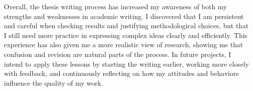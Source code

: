 \documentclass[12pt,a4paper]{article}
\begin{document}
	Overall, the thesis writing process has increased my awareness of both my strengths and weaknesses in academic writing. I discovered that I am persistent and careful when checking results and justifying methodological choices, but that I still need more practice in expressing complex ideas clearly and efficiently. This experience has also given me a more realistic view of research, showing me that confusion and revision are natural parts of the process. In future projects, I intend to apply these lessons by starting the writing earlier, working more closely with feedback, and continuously reflecting on how my attitudes and behaviors influence the quality of my work.
	
	
\end{document}
